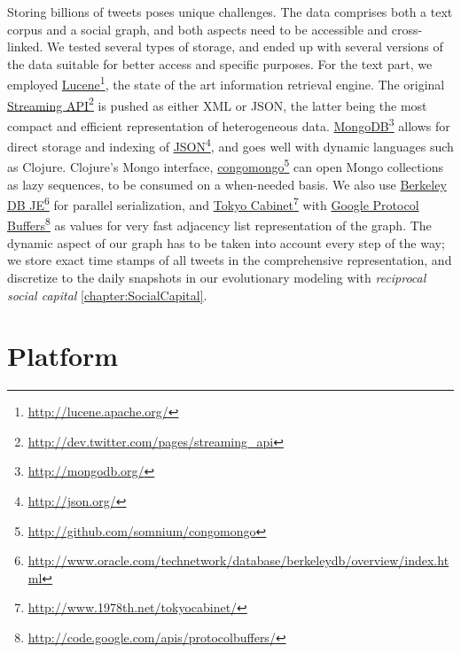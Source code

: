 \documentclass[10pt,oneside]{memoir}
\begin{document}
Storing billions of tweets poses unique challenges.  The data comprises both a text corpus and a social graph, and both aspects need to be accessible and cross-linked.  We tested several types of storage, and ended up with several versions of the data suitable for better access and specific purposes.  For the text part, we employed \href{http://lucene.apache.org/}{Lucene}\footnote{\href{http://lucene.apache.org/}{http://lucene.apache.org/}}, the state of the art information retrieval engine.  The original \href{http://dev.twitter.com/pages/streaming_api}{Streaming API}\footnote{\href{http://dev.twitter.com/pages/streaming_api}{http://dev.twitter.com/pages/streaming\_api}} is pushed as either XML or JSON, the latter being the most compact and efficient representation of heterogeneous data.  \href{http://mongodb.org/}{MongoDB}\footnote{\href{http://mongodb.org/}{http://mongodb.org/}} allows for direct storage and indexing of \href{http://json.org/}{JSON}\footnote{\href{http://json.org/}{http://json.org/}}, and goes well with dynamic languages such as Clojure.  Clojure's Mongo interface, \href{http://github.com/somnium/congomongo}{congomongo}\footnote{\href{http://github.com/somnium/congomongo}{http://github.com/somnium/congomongo}} can open Mongo collections as lazy sequences, to be consumed on a when-needed basis.  We also use \href{http://www.oracle.com/technetwork/database/berkeleydb/overview/index.html}{Berkeley DB JE}\footnote{\href{http://www.oracle.com/technetwork/database/berkeleydb/overview/index.html}{http://www.oracle.com/technetwork/database/berkeleydb/overview/index.html}} for parallel serialization, and \href{http://www.1978th.net/tokyocabinet/}{Tokyo Cabinet}\footnote{\href{http://www.1978th.net/tokyocabinet/}{http://www.1978th.net/tokyocabinet/}} with \href{http://code.google.com/apis/protocolbuffers/}{Google Protocol Buffers}\footnote{\href{http://code.google.com/apis/protocolbuffers/}{http://code.google.com/apis/protocolbuffers/}} as values for very fast adjacency list representation of the graph.  The dynamic aspect of our graph has to be taken into account every step of the way; we store exact time stamps of all tweets in the comprehensive representation, and discretize to the daily snapshots in our evolutionary modeling with {\itshape reciprocal social capital} \ref{chapter:SocialCapital}.


\pagebreak \section{Platform}
\label{platform}
\end{document}
